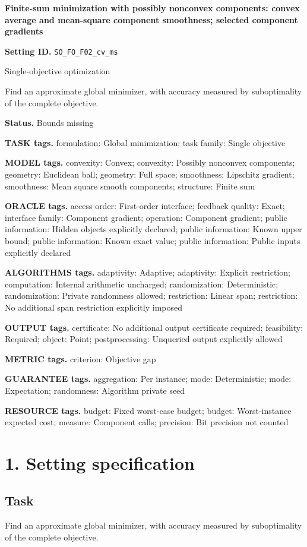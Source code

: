 \documentclass[10pt,a4paper]{article}
\begin{document}
\raggedright

{\LARGE\bfseries\sffamily\color{AtlasNavy} Finite-sum minimization with possibly nonconvex components: convex average and mean-square component smoothness; selected component gradients\par}\vspace{5pt}
\textbf{Setting ID.} \texttt{SO\_\allowbreak{}FO\_\allowbreak{}F02\_\allowbreak{}cv\_\allowbreak{}ms}

Single-objective optimization

Find an approximate global minimizer, with accuracy measured by suboptimality of the complete objective.

\textbf{Status.} Bounds missing

\textbf{TASK tags.} formulation: Global minimization; task family: Single objective

\textbf{MODEL tags.} convexity: Convex; convexity: Possibly nonconvex components; geometry: Euclidean ball; geometry: Full space; smoothness: Lipschitz gradient; smoothness: Mean square smooth components; structure: Finite sum

\textbf{ORACLE tags.} access order: First-order interface; feedback quality: Exact; interface family: Component gradient; operation: Component gradient; public information: Hidden objects explicitly declared; public information: Known upper bound; public information: Known exact value; public information: Public inputs explicitly declared

\textbf{ALGORITHMS tags.} adaptivity: Adaptive; adaptivity: Explicit restriction; computation: Internal arithmetic uncharged; randomization: Deterministic; randomization: Private randomness allowed; restriction: Linear span; restriction: No additional span restriction explicitly imposed

\textbf{OUTPUT tags.} certificate: No additional output certificate required; feasibility: Required; object: Point; postprocessing: Unqueried output explicitly allowed

\textbf{METRIC tags.} criterion: Objective gap

\textbf{GUARANTEE tags.} aggregation: Per instance; mode: Deterministic; mode: Expectation; randomness: Algorithm private seed

\textbf{RESOURCE tags.} budget: Fixed worst-case budget; budget: Worst-instance expected cost; measure: Component calls; precision: Bit precision not counted

\section{1. Setting specification}
\subsection{Task}
Find an approximate global minimizer, with accuracy measured by suboptimality of the complete objective.
\end{document}
